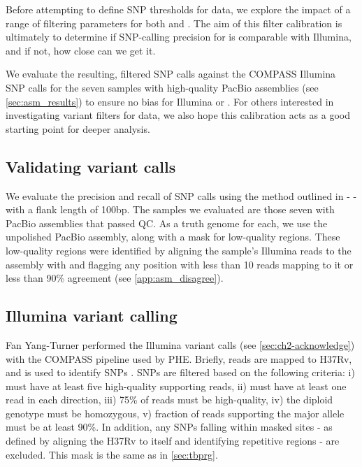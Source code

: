 Before attempting to define SNP thresholds for \ont{} data, we explore the impact of a range of filtering parameters for both \bcftools{} and \pandora{}. The aim of this filter calibration is ultimately to determine if SNP-calling precision for \ont{} is comparable with Illumina, and if not, how close can we get it.

We evaluate the resulting, filtered SNP calls against the COMPASS Illumina SNP calls for the seven samples with high-quality PacBio assemblies (see \autoref{sec:asm_results}) to ensure no bias for Illumina or \ont{}. For others interested in investigating variant filters for \ont{} data, we also hope this calibration acts as a good starting point for deeper analysis.

\subsection{Validating variant calls}

We evaluate the precision and recall of SNP calls using the method outlined in  -  - with a flank length of 100bp. The samples we evaluated are those seven with PacBio assemblies that passed QC. As a truth genome for each, we use the unpolished \flye{} PacBio assembly, along with a mask for low-quality regions. These low-quality regions were identified by aligning the sample's Illumina reads to the assembly with  and flagging any position with less than 10 reads mapping to it or less than 90\% agreement (see \autoref{app:asm_disagree}). 

\subsection{Illumina variant calling}
\label{sec:illumina-var-call}

Fan Yang-Turner performed the Illumina variant calls (see \autoref{sec:ch2-acknowledge}) with the COMPASS pipeline used by PHE. Briefly, reads are mapped to H37Rv, and  is used to identify SNPs \cite{samtools2009}. SNPs are filtered based on the following criteria: i) must have at least five high-quality supporting reads, ii) must have at least one read in each direction, iii) 75\% of reads must be high-quality, iv) the diploid genotype must be homozygous, v) fraction of reads supporting the major allele must be at least 90\%. In addition, any SNPs falling within masked sites - as defined by aligning the H37Rv to itself and identifying repetitive regions \cite{tbmask2014} - are excluded. This mask is the same as in \autoref{sec:tbprg}.

